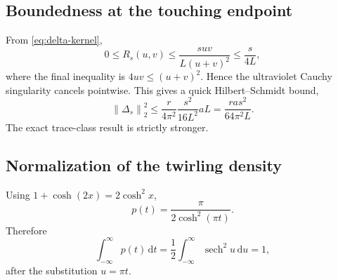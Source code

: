 \documentclass[11pt]{article}
\theoremstyle{accent}
\theoremstyle{definition}
\newcommand{\dd}{\,\mathrm{d}}
\newcommand{\norm}[1]{\left\lVert #1\right\rVert}
\begin{document}
\subsection{Boundedness at the touching endpoint}

From \eqref{eq:delta-kernel},
\[
 0\le R_s(u,v)
 \le\frac{suv}{L(u+v)^2}
 \le\frac{s}{4L},
\]
where the final inequality is \(4uv\le(u+v)^2\).  Hence the ultraviolet Cauchy singularity cancels pointwise.  This gives a quick Hilbert--Schmidt bound,
\begin{equation}\label{eq:HS-bound-appendix}
 \norm{\Delta_s}_2^2
 \le\frac{r}{4\pi^2}\frac{s^2}{16L^2}aL
 =\frac{ras^2}{64\pi^2L}.
\end{equation}
The exact trace-class result is strictly stronger.

\subsection{Normalization of the twirling density}

Using \(1+\cosh(2x)=2\cosh^2x\),
\[
 p(t)=\frac{\pi}{2\cosh^2(\pi t)}.
\]
Therefore
\[
 \int_{-\infty}^{\infty}p(t)\dd t
 =\frac12\int_{-\infty}^{\infty}\operatorname{sech}^2u\dd u
 =1,
\]
after the substitution \(u=\pi t\).
\end{document}
